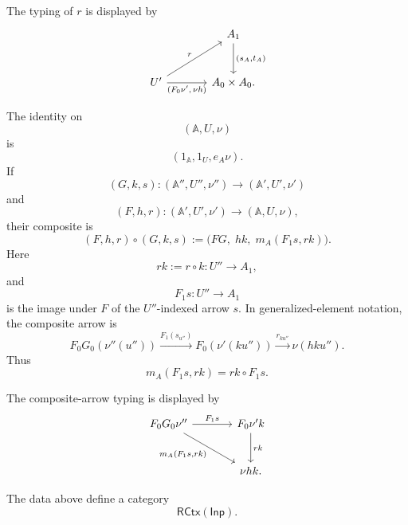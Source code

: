 The typing of \(r\) is displayed by
\[
\begin{tikzcd}[column sep=large, row sep=large]
    &
    A_1
        \arrow[d, "{(s_A,t_A)}"]
    \\
    U'
        \arrow[ur, "r"]
        \arrow[r, "{(F_0\nu',\,\nu h)}"']
    &
    A_0\times A_0 .
\end{tikzcd}
\]

The identity on
\[
    (\mathbb A,U,\nu)
\]
is
\[
    (1_{\mathbb A},1_U,e_A\nu).
\]
If
\[
    (G,k,s):
    (\mathbb A'',U'',\nu'')
    \to
    (\mathbb A',U',\nu')
\]
and
\[
    (F,h,r):
    (\mathbb A',U',\nu')
    \to
    (\mathbb A,U,\nu),
\]
their composite is
\[
    (F,h,r)\circ(G,k,s)
    :=
    \bigl(FG,\;hk,\;m_A(F_1s,rk)\bigr).
\]
Here
\[
    rk:=r\circ k:U''\to A_1,
\]
and
\[
    F_1s:U''\to A_1
\]
is the image under \(F\) of the \(U''\)-indexed arrow \(s\). In
generalized-element notation, the composite arrow is
\[
    F_0G_0(\nu''(u''))
        \xrightarrow{F_1(s_{u''})}
    F_0(\nu'(k u''))
        \xrightarrow{r_{k u''}}
    \nu(hk u'').
\]
Thus
\[
    m_A(F_1s,rk)=rk\circ F_1s.
\]

The composite-arrow typing is displayed by
\[
\begin{tikzcd}[column sep=large, row sep=large]
    F_0G_0\nu''
        \arrow[r, "{F_1s}"]
        \arrow[dr, swap, "{m_A(F_1s,rk)}"]
    &
    F_0\nu'k
        \arrow[d, "rk"]
    \\
    &
    \nu hk .
\end{tikzcd}
\]

\begin{lemma}
\label{lem:residual-context-category}
    The data above define a category
    \[
        \mathsf{RCtx}(\mathsf{Inp}).
    \]
\end{lemma}

